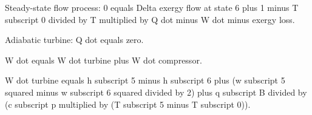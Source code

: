 Steady-state flow process:  
0 equals Delta exergy flow at state 6 plus 1 minus T subscript 0 divided by T multiplied by Q dot minus W dot minus exergy loss.  

Adiabatic turbine: Q dot equals zero.  

W dot equals W dot turbine plus W dot compressor.  

W dot turbine equals h subscript 5 minus h subscript 6 plus (w subscript 5 squared minus w subscript 6 squared divided by 2) plus q subscript B divided by (c subscript p multiplied by (T subscript 5 minus T subscript 0)).